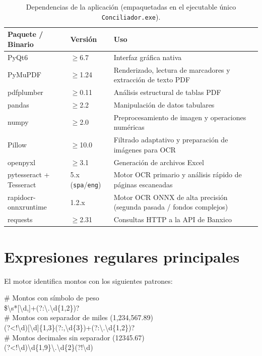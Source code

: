 \documentclass[12pt, a4paper, oneside]{report}
\begin{document}
\begin{table}[H]
  \centering
  \begin{tabularx}{\linewidth}{llX}
    \toprule
    \textbf{Paquete / Binario} & \textbf{Versión} & \textbf{Uso} \\
    \midrule
    PyQt6         & $\geq$6.7  & Interfaz gráfica nativa \\
    PyMuPDF       & $\geq$1.24 & Renderizado, lectura de marcadores y extracción de texto PDF \\
    pdfplumber    & $\geq$0.11 & Análisis estructural de tablas PDF \\
    pandas        & $\geq$2.2  & Manipulación de datos tabulares \\
    numpy         & $\geq$2.0  & Preprocesamiento de imagen y operaciones numéricas \\
    Pillow        & $\geq$10.0 & Filtrado adaptativo y preparación de imágenes para OCR \\
    openpyxl      & $\geq$3.1  & Generación de archivos Excel \\
    pytesseract + Tesseract & 5.x (\texttt{spa}/\texttt{eng}) & Motor OCR primario y análisis rápido de páginas escaneadas \\
    rapidocr-onnxruntime & 1.2.x      & Motor OCR ONNX de alta precisión (segunda pasada / fondos complejos) \\
    requests      & $\geq$2.31 & Consultas HTTP a la API de Banxico \\
    \bottomrule
  \end{tabularx}
  \caption{Dependencias de la aplicación (empaquetadas en el ejecutable único \texttt{Conciliador.exe}).}
\end{table}

\section{Expresiones regulares principales}

El motor identifica montos con los siguientes patrones:

\begin{rutabox}
\# Montos con símbolo de peso\\
\$\textbackslash{}s*[\textbackslash{}d,]+(?:\textbackslash{}.\textbackslash{}d\{1,2\})?\\[4pt]
\# Montos con separador de miles (1,234,567.89)\\
(?<!\textbackslash{}d)[\textbackslash{}d]\{1,3\}(?:,\textbackslash{}d\{3\})+(?:\textbackslash{}.\textbackslash{}d\{1,2\})?\\[4pt]
\# Montos decimales sin separador (12345.67)\\
(?<!\textbackslash{}d)\textbackslash{}d\{1,9\}\textbackslash{}.\textbackslash{}d\{2\}(?!\textbackslash{}d)
\end{rutabox}
\end{document}
